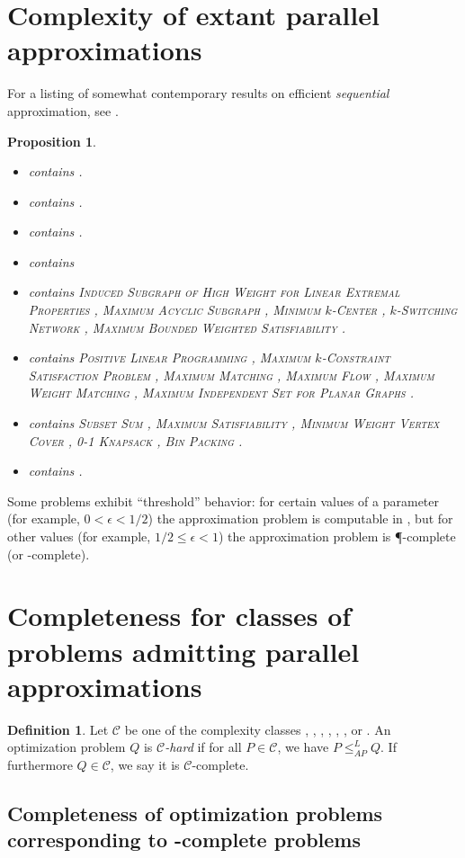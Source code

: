 \documentclass[]{article}
\theoremstyle{plain}
\newtheorem{proposition}{Proposition}
\theoremstyle{definition}
\newtheorem{definition}{Definition}
\newcommand{\APr}{\leq_{AP}^{L}}
\newcommand{\apxncoproblems}{%
  \textsc{Induced Subgraph of High Weight for Linear Extremal Properties} \cite{dsst97},
  \textsc{Maximum Acyclic Subgraph} \cite[Section~7.4]{dsst97},
  \textsc{Minimum $k$-Center} \cite[Section~7.4]{dsst97},
  \textsc{$k$-Switching Network} \cite[Section~7.4]{dsst97},
  \textsc{Maximum Bounded Weighted Satisfiability} \cite[Theorem~4]{sx95}}
\newcommand{\expapxncoproblems}{}
\newcommand{\fncasproblems}{%
  \textsc{Subset Sum} \cite[Theorem~4.1.4]{dsst97},
  \textsc{Maximum Satisfiability} \cite[Theorem~8]{trevisan98},
  \textsc{Minimum Weight Vertex Cover} \cite[Theorem~5.3.6]{dsst97},
  \textsc{0-1 Knapsack} \cite[Theorem~2]{mayr88},
  \textsc{Bin Packing} \cite[Theorem~3]{mayr88}}
\newcommand{\logapxncoproblems}{}
\newcommand{\ncasproblems}{%
  \textsc{Positive Linear Programming} \cite[Theorem~5.1.11]{dsst97},
  \textsc{Maximum $k$-Constraint Satisfaction Problem} \cite[Corollary~13]{trevisan98},
  \textsc{Maximum Matching} \cite[Theorem~5.2.1]{dsst97},
  \textsc{Maximum Flow} \cite[Theorem~5.2.2]{dsst97},
  \textsc{Maximum Weight Matching} \cite[Theorem~5.2.2]{dsst97},
  \textsc{Maximum Independent Set for Planar Graphs} \cite[Theorem 6.4.1]{dsst97}}
\newcommand{\ncoproblems}{}
\newcommand{\nncoproblems}{}
\newcommand{\polyapxncoproblems}{}
\begin{document}
\section{Complexity of extant parallel approximations}

For a listing of somewhat contemporary results on efficient \emph{sequential} approximation, see \cite{compendium}.

\begin{proposition}
  \mbox{}
  \begin{itemize}
  \item \NNCO{} contains \nncoproblems.
  \item \expApxNCO{} contains \expapxncoproblems.
  \item \polyApxNCO{} contains \polyapxncoproblems.
  \item \logApxNCO{} contains \logapxncoproblems
  \item \ApxNCO{} contains \apxncoproblems.
  \item \NCAS{} contains \ncasproblems.
  \item \FNCAS{} contains \fncasproblems.
  \item \NCO{} contains \ncoproblems.
  \end{itemize}
\end{proposition}

Some problems exhibit ``threshold'' behavior: for certain values of a parameter (for example, $0 < \epsilon < 1/2$) the approximation problem is computable in \NC, but for other values (for example, $1/2 \leq \epsilon < 1$) the approximation problem is \P-complete (or \NP-complete).

\section{Completeness for classes of problems admitting parallel approximations}
\label{sec:completeness}

\begin{definition}
  Let $\mathcal{C}$ be one of the complexity classes \NCO, \NCAS, \ApxNCO, \logApxNCO, \polyApxNCO, \expApxNCO, or \NNCO.
  An optimization problem $Q$ is \emph{$\mathcal{C}$-hard} if for all $P\in\mathcal{C}$, we have $P\APr Q$.
  If furthermore $Q\in\mathcal{C}$, we say it is $\mathcal{C}$-complete.
\end{definition}

\subsection{Completeness of optimization problems corresponding to \texorpdfstring{\NP}{NP}-complete problems}
\end{document}
